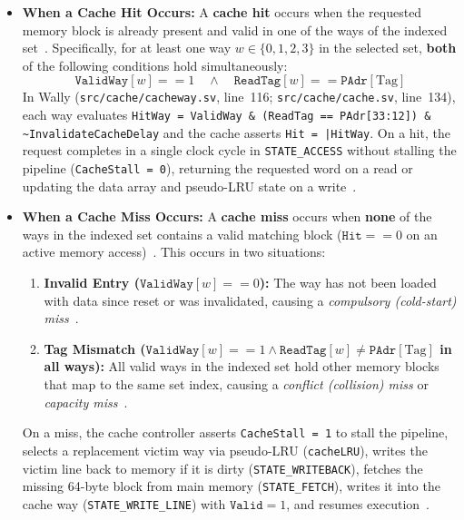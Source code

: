 \documentclass[11pt,a4paper]{article}
\begin{document}
\begin{itemize}[leftmargin=1.4em, itemsep=3.5pt, topsep=2pt]
    \item \textbf{When a Cache Hit Occurs:} A \textbf{cache hit} occurs when the requested memory block is already present and valid in one of the ways of the indexed set~\cite{patterson2020,harris2021}. Specifically, for at least one way $w \in \{0, 1, 2, 3\}$ in the selected set, \textbf{both} of the following conditions hold simultaneously:
    \[
    \texttt{ValidWay}[w] == 1 \quad \land \quad \texttt{ReadTag}[w] == \texttt{PAdr}[\text{Tag}]
    \]
    In Wally (\texttt{src/cache/cacheway.sv}, line~116; \texttt{src/cache/cache.sv}, line~134), each way evaluates \texttt{HitWay = ValidWay \& (ReadTag == PAdr[33:12]) \& \textasciitilde InvalidateCacheDelay} and the cache asserts \texttt{Hit = |HitWay}. On a hit, the request completes in a single clock cycle in \texttt{STATE\_ACCESS} without stalling the pipeline (\texttt{CacheStall = 0}), returning the requested word on a read or updating the data array and pseudo-LRU state on a write~\cite{harris2021,wallydoc}.

    \item \textbf{When a Cache Miss Occurs:} A \textbf{cache miss} occurs when \textbf{none} of the ways in the indexed set contains a valid matching block ($\texttt{Hit} == 0$ on an active memory access)~\cite{patterson2020,harris2021}. This occurs in two situations:
    \begin{enumerate}[leftmargin=1.4em, itemsep=2pt, topsep=1.5pt]
        \item \textbf{Invalid Entry ($\texttt{ValidWay}[w] == 0$):} The way has not been loaded with data since reset or was invalidated, causing a \emph{compulsory (cold-start) miss}~\cite{patterson2020,harris2021}.
        \item \textbf{Tag Mismatch ($\texttt{ValidWay}[w] == 1 \land \texttt{ReadTag}[w] \neq \texttt{PAdr}[\text{Tag}]$ in all ways):} All valid ways in the indexed set hold other memory blocks that map to the same set index, causing a \emph{conflict (collision) miss} or \emph{capacity miss}~\cite{patterson2020,harris2021}.
    \end{enumerate}
    On a miss, the cache controller asserts \texttt{CacheStall = 1} to stall the pipeline, selects a replacement victim way via pseudo-LRU (\texttt{cacheLRU}), writes the victim line back to memory if it is dirty (\texttt{STATE\_WRITEBACK}), fetches the missing 64-byte block from main memory (\texttt{STATE\_FETCH}), writes it into the cache way (\texttt{STATE\_WRITE\_LINE}) with $\texttt{Valid} = 1$, and resumes execution~\cite{harris2021,wallydoc}.
\end{itemize}
\end{document}
